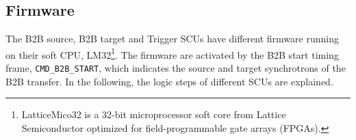 %

\subsection{Firmware}
\label{sec_firmware}
The B2B source, B2B target and Trigger SCUs have different firmware running on their soft \gls{CPU}, LM32\footnote{LatticeMico32 is a 32-bit microprocessor soft core from Lattice Semiconductor optimized for field-programmable gate arrays (\gls{FPGA}s).}. The firmware are activated by the  B2B start timing frame, \verb|CMD_B2B_START|, which indicates the source and target synchrotrons of the B2B transfer. In the following, the logic steps of different SCUs are explained.

